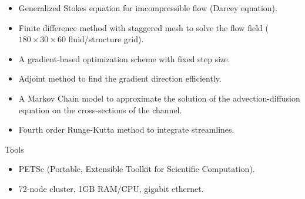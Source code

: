 \documentclass[12pt,t]{beamer}
\begin{document}
\begin{frame}

  \begin{itemize}
   \item Generalized Stokes equation for imcompressible flow (Darcey equation).
   \item Finite difference method with staggered mesh to solve the flow field ($180 \times 30 \times 60$ fluid/structure grid).
   \item A gradient-based optimization scheme with fixed step size.
   \item Adjoint method to find the gradient direction efficiently. 
   \item A Markov Chain model to approximate the solution of the advection-diffusion equation on the cross-sections of the channel.
   \item Fourth order Runge-Kutta method to integrate streamlines.
   \end{itemize}
   Tools
   \begin{itemize}
   \item PETSc (Portable, Extensible Toolkit for Scientific Computation).
   \item 72-node cluster, 1GB RAM/CPU, gigabit ethernet.
   \end{itemize}
\end{frame}


\end{document}

